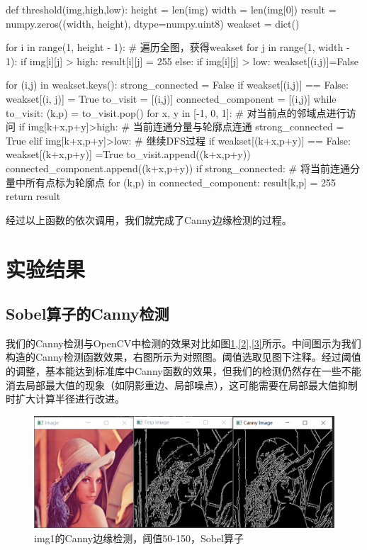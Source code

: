 \documentclass{article}
\begin{document}
\begin{python}
def threshold(img,high,low):
    height = len(img)
    width = len(img[0])
    result = numpy.zeros((width, height), dtype=numpy.uint8)
    weakset = dict()

    for i in range(1, height - 1):   # 遍历全图，获得weakset
        for j in range(1, width - 1):
            if img[i][j] > high:
                result[i][j] = 255
            else:
                if img[i][j] > low:
                    weakset[(i,j)]=False

    for (i,j) in weakset.keys():
        strong_connected = False
        if weakset[(i,j)] == False:
            weakset[(i, j)] = True
            to_visit = [(i,j)]
            connected_component = [(i,j)]
            while to_visit:
                (k,p) = to_visit.pop()
                for x, y in [-1, 0, 1]:    # 对当前点的邻域点进行访问
                    if img[k+x,p+y]>high:  # 当前连通分量与轮廓点连通
                        strong_connected = True
                    elif img[k+x,p+y]>low: # 继续DFS过程
                        if weakset[(k+x,p+y)] == False:
                            weakset[(k+x,p+y)] =True
                            to_visit.append((k+x,p+y))
                            connected_component.append((k+x,p+y))
            if strong_connected:           # 将当前连通分量中所有点标为轮廓点
                for (k,p) in connected_component:
                    result[k,p] = 255
    return result
\end{python}

经过以上函数的依次调用，我们就完成了Canny边缘检测的过程。



\section{实验结果}

\subsection{Sobel算子的Canny检测}
我们的Canny检测与OpenCV中检测的效果对比如图\ref{1},\ref{2},\ref{3}所示。中间图示为我们构造的Canny检测函数效果，右图所示为对照图。阈值选取见图下注释。经过阈值的调整，基本能达到标准库中Canny函数的效果，但我们的检测仍然存在一些不能消去局部最大值的现象（如阴影重边、局部噪点），这可能需要在局部最大值抑制时扩大计算半径进行改进。

\begin{figure}[htbp]
\centering
\includegraphics[width=13.5cm]{img/1-1.png}
\caption{img1的Canny边缘检测，阈值50-150，Sobel算子}
\label{1}
\end{figure}
\end{document}
